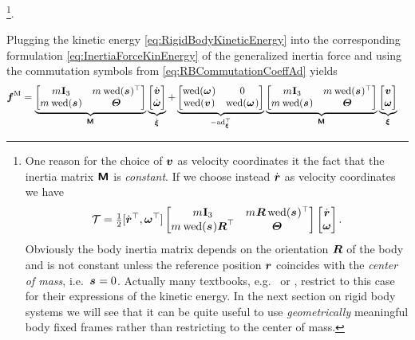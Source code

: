 \footnote{
One reason for the choice of $\boldsymbol{v}$ as velocity coordinates it the fact that the inertia matrix $\bodyInertiaMat{}{}$ is \textit{constant}.
If we choose instead $\dot{\boldsymbol{r}}$ as velocity coordinates we have
\begin{align*}
 \kineticEnergy = \tfrac{1}{2} [\rd^\top, \w^\top] \begin{bmatrix} \bodyMass{}{} \idMat[3] & \bodyMass{}{} \R \wedOp(\bodyCOM{}{})^\top \\ \bodyMass{}{} \wedOp(\bodyCOM{}{}) \R^\top & \bodyMOI{}{} \end{bmatrix} \begin{bmatrix} \rd \\ \w \end{bmatrix}.
\end{align*}
Obviously the body inertia matrix depends on the orientation $\boldsymbol{R}$ of the body and is not constant unless the reference position $\boldsymbol{r}$ coincides with the \textit{center of mass}, i.e.\ $\bodyCOM{}{}{} = 0$.
Actually many textbooks, e.g.\ \cite[p.\,167]{Murray:Robotic} or \cite[p.\,153]{Shabana:MultibodySystems}, restrict to this case for their expressions of the kinetic energy.
In the next section on rigid body systems we will see that it can be quite useful to use \textit{geometrically} meaningful body fixed frames rather than restricting to the center of mass.
}.

Plugging the kinetic energy \eqref{eq:RigidBodyKineticEnergy} into the corresponding formulation \eqref{eq:InertiaForceKinEnergy} of the generalized inertia force and using the commutation symbols from \eqref{eq:RBCommutationCoeffAd} yields
\begin{align}\label{eq:InertiaForceRB}
 \genForceInertia &=
 \underbrace{\begin{bmatrix} \bodyMass{}{}\idMat[3] & \bodyMass{}{} \wedOp(\bodyCOM{}{})^\top \\ \bodyMass{}{} \wedOp(\bodyCOM{}{}) & \bodyMOI{}{} \end{bmatrix}}_{\bodyInertiaMat{}{}}
 \underbrace{\begin{bmatrix} \vd \\ \dot{\w} \end{bmatrix}}_{\bodyVeld{}{}}
 +
 \underbrace{\begin{bmatrix} \wedOp(\bodyAngVel{}{}) & 0 \\ \wedOp(\bodyLinVel{}{}) & \wedOp(\bodyAngVel{}{}) \end{bmatrix}}_{-\ad{\sysVel}^\top}
 \underbrace{\begin{bmatrix} \bodyMass{}{}\idMat[3] & \bodyMass{}{} \wedOp(\bodyCOM{}{})^\top \\ \bodyMass{}{} \wedOp(\bodyCOM{}{}) & \bodyMOI{}{} \end{bmatrix}}_{\bodyInertiaMat{}{}}
 \underbrace{\begin{bmatrix} \v \\ \w \end{bmatrix}}_{\bodyVel{}{}}
\end{align}


